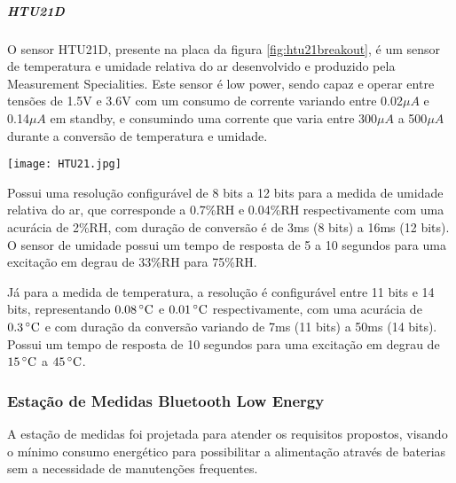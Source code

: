 
\subparagraph{HTU21D} O sensor HTU21D, presente na placa da figura
\ref{fig:htu21breakout}, é um sensor de temperatura e umidade relativa do ar
desenvolvido e produzido pela Measurement Specialities. Este sensor é low
power, sendo capaz e operar entre tensões de 1.5V e 3.6V com um consumo de
corrente variando entre 0.02$\mu A$ e 0.14$\mu A$ em standby, e consumindo uma
corrente que varia entre 300$\mu A$ a 500$\mu A$ durante a conversão de
temperatura e umidade. \cite{HTU21DDatasheet}

\begin{center}
	\centering 
	\texttt{[image: HTU21.jpg]}
	\label{fig:htu21breakout}
\end{center} 

Possui uma  resolução configurável de 8 bits a 12 bits para a medida de umidade
relativa do ar, que corresponde a 0.7\%RH e 0.04\%RH respectivamente com uma
acurácia de 2\%RH, com duração de conversão é de 3ms (8 bits) a 16ms (12 bits).
O sensor de umidade possui um tempo de resposta de 5 a 10 segundos para uma
excitação em degrau de 33\%RH para 75\%RH. \cite{HTU21DDatasheet}

Já para a medida de temperatura, a resolução é configurável entre 11 bits e 14
bits, representando $0.08\,^{\circ}{\rm C}$ e $0.01\,^{\circ}{\rm C}$
respectivamente, com uma acurácia de $0.3\,^{\circ}{\rm C}$ e com duração da
conversão variando de 7ms (11 bits) a 50ms (14 bits). Possui um tempo de
resposta de 10 segundos para uma excitação em degrau de $15\,^{\circ}{\rm C}$ a
$45\,^{\circ}{\rm C}$.\cite{HTU21DDatasheet}

\subsubsection{Estação de Medidas Bluetooth Low Energy}

A estação de medidas foi projetada para atender os requisitos propostos,
visando o mínimo consumo energético para possibilitar a alimentação através de
baterias sem a necessidade de manutenções frequentes.

